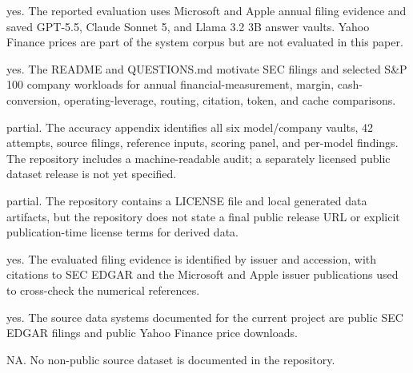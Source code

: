\documentclass[letterpaper]{article}
\begin{document}
\begin{itemize}

yes. The reported evaluation uses Microsoft and Apple annual filing evidence and saved GPT-5.5, Claude Sonnet 5, and Llama 3.2 3B answer vaults. Yahoo Finance prices are part of the system corpus but are not evaluated in this paper.

\begin{itemize}

	yes. The README and QUESTIONS.md motivate SEC filings and selected S\&P 100 company workloads for annual financial-measurement, margin, cash-conversion, operating-leverage, routing, citation, token, and cache comparisons.

	partial. The accuracy appendix identifies all six model/company vaults, 42 attempts, source filings, reference inputs, scoring panel, and per-model findings. The repository includes a machine-readable audit; a separately licensed public dataset release is not yet specified.

	partial. The repository contains a LICENSE file and local generated data artifacts, but the repository does not state a final public release URL or explicit publication-time license terms for derived data.

	yes. The evaluated filing evidence is identified by issuer and accession, with citations to SEC EDGAR and the Microsoft and Apple issuer publications used to cross-check the numerical references.

	yes. The source data systems documented for the current project are public SEC EDGAR filings and public Yahoo Finance price downloads.

	NA. No non-public source dataset is documented in the repository.

\end{itemize}
\end{itemize}
\end{document}
